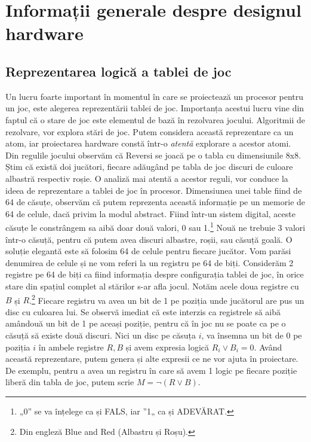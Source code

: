 \documentclass[12pt,twoside,a4paper,fleqn]{book}
\theoremstyle{definition}
\begin{document}
\section{Informații generale despre designul\\ \mbox{hardware}}
\subsection{Reprezentarea logică a tablei de joc}
\label{repr_logica}
Un lucru foarte important în momentul în care se proiectează un procesor pentru un joc, este alegerea reprezentării tablei de joc. Importanța acestui lucru vine din faptul că o stare de joc este elementul de bază în rezolvarea jocului. Algoritmii de rezolvare, vor explora stări de joc. Putem considera această reprezentare ca un atom, iar proiectarea hardware constă într-o \emph{atentă} explorare a acestor atomi.\\
Din regulile jocului observăm că Reversi se joacă pe o tabla cu dimensiunile 8x8. Știm că există doi jucători, fiecare adăugând pe tabla de joc discuri de culoare albastră respectiv roșie. O analiză mai atentă a acestor reguli, vor conduce la ideea de reprezentare a tablei de joc în procesor. Dimensiunea unei table fiind de 64 de căsuțe, observăm că putem reprezenta această informație pe un memorie de 64 de celule, dacă privim la modul abstract. Fiind într-un sistem digital, aceste căsuțe le constrângem sa aibă doar două valori, 0 sau 1.\footnote{„0” se va înțelege ca și FALS, iar ”1„ ca și ADEVĂRAT.} Nouă ne trebuie 3 valori într-o căsuță, pentru că putem avea discuri albastre, roșii, sau căsuță goală. O soluție elegantă este să folosim 64 de celule pentru fiecare jucător. Vom parăsi denumirea de celule și ne vom referi la un registru pe 64 de biți. Considerăm 2 registre pe 64 de biți ca fiind informația despre configurația tablei de joc, în orice stare din spațiul complet al stărilor s-ar afla jocul. Notăm acele doua registre cu $B$ și $R$.\footnote{Din engleză Blue and Red (Albastru și Roșu).} Fiecare registru va avea un bit de 1 pe poziția unde jucătorul are pus un disc cu culoarea lui. Se observă imediat că este interzis ca registrele să aibă amândouă un bit de 1 pe aceași poziție, pentru că în joc nu se poate ca pe o căsuță să existe două discuri. Nici un disc pe căsuța $i$, va însemna un bit de 0 pe poziția $i$ în ambele registre $R,B$ și avem expresia logică $R_{i} \lor B_{i}  = 0$. Având această reprezentare, putem genera și alte expresii ce ne vor ajuta în proiectare. De exemplu, pentru a avea un registru în care să avem 1 logic pe fiecare poziție liberă din tabla de joc, putem scrie $M = \lnot(R \lor B)$. \label{lOthelloExpr}
\end{document}
